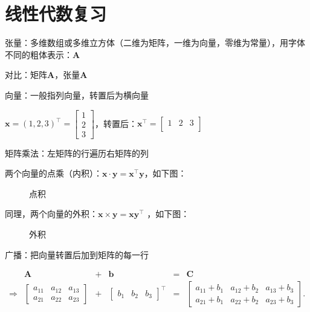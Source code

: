 \section{线性代数复习}%
\label{sec:线性代数复习}
\begin{defi}
    张量：多维数组或多维立方体（二维为矩阵，一维为向量，零维为常量），用字体不同的粗体表示：\textbf{\textsf{A}}

    对比：矩阵$\bm{A}$，张量\textbf{\textsf{A}}
\end{defi}
\begin{defi}
    向量：一般指列向量，转置后为横向量
\end{defi}
\begin{eg}
    $\bm{x}=\left( 1,2,3 \right)^\top=\begin{bmatrix}
        1\\
        2\\
        3
    \end{bmatrix}$，转置后：$\bm{x}^\top=\begin{bmatrix}
    1 & 2 & 3\\
    \end{bmatrix}$
\end{eg}
\begin{defi}
    矩阵乘法：左矩阵的行遍历右矩阵的列
\end{defi}
\begin{eg}
    两个向量的点乘（内积）：$\bm{x}\cdot \bm{y}=\bm{x}^\top\bm{y}$，如下图：
\begin{figure}[ht]
    \centering
    \caption{点积}
    \label{fig:点积}
\end{figure}

同理，两个向量的外积：$\bm{x}\times \bm{y}=\bm{x}\bm{y}^\top $ ，如下图：
\begin{figure}[ht]
    \centering
    \caption{外积}
    \label{fig:外积}
\end{figure}
\end{eg}
\begin{defi}
    广播：把向量转置后加到矩阵的每一行
\end{defi}
\begin{eg}
    \begin{align*}
        &\bm{A}&+&\bm{b}&=&\bm{C}\\
        \Rightarrow& \begin{bmatrix}
            a_{11} & a_{12} & a_{13}\\
            a_{21} & a_{22} & a_{23}
        \end{bmatrix} &+& \begin{bmatrix}
            b_1 & b_2 & b_3
        \end{bmatrix}^\top &=& \begin{bmatrix}
            a_{11}+b_1 & a_{12}+b_2 & a_{13}+b_3\\
            a_{21}+b_1 & a_{22}+b_2 & a_{23}+b_3
        \end{bmatrix}
    .\end{align*}
\end{eg}
